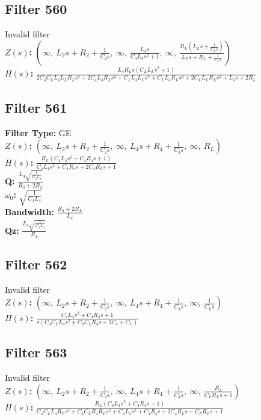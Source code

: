 \documentclass{article}
\begin{document}
\subsection*{Filter 560}
Invalid filter \\ 
\textbf{$Z(s)$:} $\left( \infty, \  L_{2} s + R_{2} + \frac{1}{C_{2} s}, \  \infty, \  \frac{L_{4} s}{C_{4} L_{4} s^{2} + 1}, \  \infty, \  \frac{R_{L} \left(L_{L} s + \frac{1}{C_{L} s}\right)}{L_{L} s + R_{L} + \frac{1}{C_{L} s}}\right)$ \\ 
\textbf{$H(s)$:} $\frac{L_{4} R_{L} s \left(C_{L} L_{L} s^{2} + 1\right)}{2 C_{4} C_{L} L_{4} L_{L} R_{L} s^{4} + 2 C_{4} L_{4} R_{L} s^{2} + C_{L} L_{4} L_{L} s^{3} + C_{L} L_{4} R_{L} s^{2} + 2 C_{L} L_{L} R_{L} s^{2} + L_{4} s + 2 R_{L}}$ \\ 
\subsection*{Filter 561}
\textbf{Filter Type:} GE \\ 
\textbf{$Z(s)$:} $\left( \infty, \  L_{2} s + R_{2} + \frac{1}{C_{2} s}, \  \infty, \  L_{4} s + R_{4} + \frac{1}{C_{4} s}, \  \infty, \  R_{L}\right)$ \\ 
\textbf{$H(s)$:} $\frac{R_{L} \left(C_{4} L_{4} s^{2} + C_{4} R_{4} s + 1\right)}{C_{4} L_{4} s^{2} + C_{4} R_{4} s + 2 C_{4} R_{L} s + 1}$ \\ 
\textbf{Q:} $\frac{L_{4} \sqrt{\frac{1}{C_{4} L_{4}}}}{R_{4} + 2 R_{L}}$ \\ 
\textbf{$\omega_0$:} $\sqrt{\frac{1}{C_{4} L_{4}}}$ \\ 
\textbf{Bandwidth:} $\frac{R_{4} + 2 R_{L}}{L_{4}}$ \\ 
\textbf{Qz:} $\frac{L_{4} \sqrt{\frac{1}{C_{4} L_{4}}}}{R_{4}}$ \\ 
\subsection*{Filter 562}
Invalid filter \\ 
\textbf{$Z(s)$:} $\left( \infty, \  L_{2} s + R_{2} + \frac{1}{C_{2} s}, \  \infty, \  L_{4} s + R_{4} + \frac{1}{C_{4} s}, \  \infty, \  \frac{1}{C_{L} s}\right)$ \\ 
\textbf{$H(s)$:} $\frac{C_{4} L_{4} s^{2} + C_{4} R_{4} s + 1}{s \left(C_{4} C_{L} L_{4} s^{2} + C_{4} C_{L} R_{4} s + 2 C_{4} + C_{L}\right)}$ \\ 
\subsection*{Filter 563}
Invalid filter \\ 
\textbf{$Z(s)$:} $\left( \infty, \  L_{2} s + R_{2} + \frac{1}{C_{2} s}, \  \infty, \  L_{4} s + R_{4} + \frac{1}{C_{4} s}, \  \infty, \  \frac{R_{L}}{C_{L} R_{L} s + 1}\right)$ \\ 
\textbf{$H(s)$:} $\frac{R_{L} \left(C_{4} L_{4} s^{2} + C_{4} R_{4} s + 1\right)}{C_{4} C_{L} L_{4} R_{L} s^{3} + C_{4} C_{L} R_{4} R_{L} s^{2} + C_{4} L_{4} s^{2} + C_{4} R_{4} s + 2 C_{4} R_{L} s + C_{L} R_{L} s + 1}$ \\ 
\end{document}
